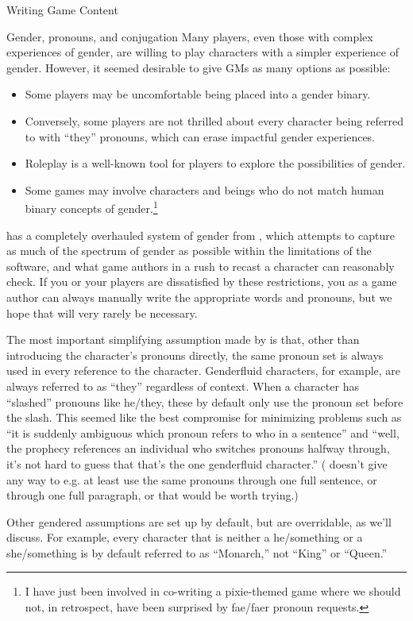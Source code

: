 \documentclass[sheet]{GameTexBase}
\begin{document}
\begin{section}{Writing Game Content}
\begin{subsection}{Gender, pronouns, and conjugation}
Many players, even those with complex experiences of gender, are willing to play characters with a simpler experience of gender.  However, it seemed desirable to give GMs as many options as possible:
\begin{itemize}
\item Some players may be uncomfortable being placed into a gender binary.
\item Conversely, some players are not thrilled about every character being referred to with ``they'' pronouns, which can erase impactful gender experiences.
\item Roleplay is a well-known tool for players to explore the possibilities of gender.
\item Some games may involve characters and beings who do not match human binary concepts of gender.\footnote{I have just been involved in co-writing a pixie-themed game where we should not, in retrospect, have been surprised by fae/faer pronoun requests.}
\end{itemize}

\lrstex{} has a completely overhauled system of gender from \gametex{}, which attempts to capture as much of the spectrum of gender as possible within the limitations of the software, and what game authors in a rush to recast a character can reasonably check.  If you or your players are dissatisfied by these restrictions, you as a game author can always manually write the appropriate words and pronouns, but we hope that will very rarely be necessary.

The most important simplifying assumption made by \lrstex{} is that, other than introducing the character's pronouns directly, the same pronoun set is always used in every reference to the character.  Genderfluid characters, for example, are always referred to as ``they'' regardless of context.  When a character has ``slashed'' pronouns like he/they, these by default only use the pronoun set before the slash.  This seemed like the best compromise for minimizing problems such as ``it is suddenly ambiguous which pronoun refers to who in a sentence'' and ``well, the prophecy references an individual who switches pronouns halfway through, it's not hard to guess that that's the one genderfluid character.''  (\latex{} doesn't give any way to e.g. at least use the same pronouns through one full sentence, or through one full paragraph, or that would be worth trying.)

Other gendered assumptions are set up by default, but are overridable, as we'll discuss.  For example, every character that is neither a he/something or a she/something is by default referred to as ``Monarch,'' not ``King'' or ``Queen.''


\end{subsection}
\end{section}
\end{document}
